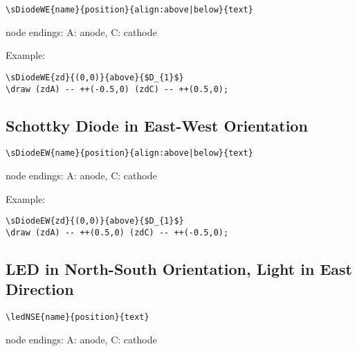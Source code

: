\documentclass[parskip=full]{scrartcl}
\begin{document}
\begin{verbatim}
\sDiodeWE{name}{position}{align:above|below}{text}
\end{verbatim}
node endings: A: anode, C: cathode

Example:\\
\begin{minipage}{0.8\textwidth}
\begin{verbatim}
\sDiodeWE{zd}{(0,0)}{above}{$D_{1}$}
\draw (zdA) -- ++(-0.5,0) (zdC) -- ++(0.5,0);
\end{verbatim}
\end{minipage}
\begin{minipage}{0.19\textwidth}
\end{minipage}

\subsection{Schottky Diode in East-West Orientation}

\begin{verbatim}
\sDiodeEW{name}{position}{align:above|below}{text}
\end{verbatim}
node endings: A: anode, C: cathode

Example:\\
\begin{minipage}{0.8\textwidth}
\begin{verbatim}
\sDiodeEW{zd}{(0,0)}{above}{$D_{1}$}
\draw (zdA) -- ++(0.5,0) (zdC) -- ++(-0.5,0);
\end{verbatim}
\end{minipage}
\begin{minipage}{0.19\textwidth}
\end{minipage}

\subsection{LED in North-South Orientation, Light in East Direction}

\begin{verbatim}
\ledNSE{name}{position}{text}
\end{verbatim}
node endings: A: anode, C: cathode
\end{document}
